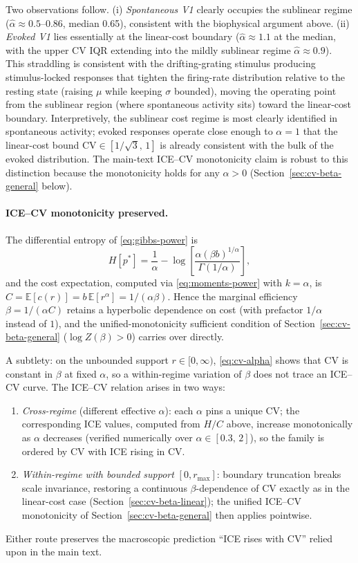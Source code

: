 \documentclass[11pt]{article}
\theoremstyle{remark}
\theoremstyle{definition}
\begin{document}
Two observations follow.  (i) \emph{Spontaneous V1} clearly occupies the sublinear regime ($\hat\alpha\approx 0.5$--$0.86$, median 0.65), consistent with the biophysical argument above.  (ii) \emph{Evoked V1} lies essentially at the linear-cost boundary ($\hat\alpha\approx 1.1$ at the median, with the upper CV IQR extending into the mildly sublinear regime $\hat\alpha\approx 0.9$).  This straddling is consistent with the drifting-grating stimulus producing stimulus-locked responses that tighten the firing-rate distribution relative to the resting state (raising $\mu$ while keeping $\sigma$ bounded), moving the operating point from the sublinear region (where spontaneous activity sits) toward the linear-cost boundary.  Interpretively, the sublinear cost regime is most clearly identified in spontaneous activity; evoked responses operate close enough to $\alpha=1$ that the linear-cost bound $\mathrm{CV}\in[1/\sqrt{3},\,1]$ is already consistent with the bulk of the evoked distribution.  The main-text ICE--CV monotonicity claim is robust to this distinction because the monotonicity holds for any $\alpha>0$ (Section~\ref{sec:cv-beta-general} below).

\paragraph{ICE--CV monotonicity preserved.}
The differential entropy of \eqref{eq:gibbs-power} is
\begin{equation}
  H[p^{*}] = \frac{1}{\alpha} - \log\!\left[\frac{\alpha(\beta b)^{1/\alpha}}{\Gamma(1/\alpha)}\right],
\end{equation}
and the cost expectation, computed via \eqref{eq:moments-power} with $k=\alpha$, is $C = \mathbb{E}[c(r)] = b\,\mathbb{E}[r^{\alpha}] = 1/(\alpha\beta)$.  Hence the marginal efficiency $\beta = 1/(\alpha C)$ retains a hyperbolic dependence on cost (with prefactor $1/\alpha$ instead of $1$), and the unified-monotonicity sufficient condition of Section~\ref{sec:cv-beta-general} ($\log Z(\beta) > 0$) carries over directly.

A subtlety: on the unbounded support $r\in[0,\infty)$, \eqref{eq:cv-alpha} shows that CV is constant in $\beta$ at fixed $\alpha$, so a within-regime variation of $\beta$ does not trace an ICE--CV curve.  The ICE--CV relation arises in two ways:
\begin{enumerate}
  \item \emph{Cross-regime} (different effective $\alpha$): each $\alpha$ pins a unique CV; the corresponding ICE values, computed from $H/C$ above, increase monotonically as $\alpha$ decreases (verified numerically over $\alpha\in[0.3,\,2]$), so the family is ordered by CV with ICE rising in CV.
  \item \emph{Within-regime with bounded support} $[0,r_{\max}]$: boundary truncation breaks scale invariance, restoring a continuous $\beta$-dependence of CV exactly as in the linear-cost case (Section~\ref{sec:cv-beta-linear}); the unified ICE--CV monotonicity of Section~\ref{sec:cv-beta-general} then applies pointwise.
\end{enumerate}
Either route preserves the macroscopic prediction ``ICE rises with CV'' relied upon in the main text.
\end{document}
